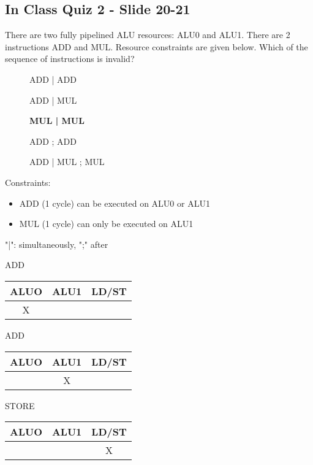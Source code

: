 \documentclass{report}
\newcommand{\cmark}{\ding{51}}%
\newcommand{\xmark}{\ding{55}}%
\begin{document}
\subsection{In Class Quiz 2 - Slide 20-21}
There are two fully pipelined ALU resources: ALU0 and ALU1. There are 2 instructions ADD and MUL. Resource constraints are given below. Which of the sequence of instructions is invalid?
\vspace{-1em}
\begin{multicols}{2}
  \begin{description}
    \item [\cmark] ADD | ADD
    \item [\cmark] ADD | MUL
    \item [\xmark] \textbf{MUL | MUL}
    \item [\cmark] ADD ; ADD
    \item [\cmark] ADD | MUL ; MUL
  \end{description}
  \setlength{\leftskip}{-8em}
  Constraints:
  \begin{itemize}
  \setlength{\leftskip}{-8em}
    \item ADD (1 cycle) can be executed on ALU0 or ALU1
    \item MUL (1 cycle) can only be executed on ALU1
  \end{itemize}
  "|": simultaneously, ";" after
\end{multicols}
\vspace{-2em}
\begin{multicols}{3}
ADD \\
\begin{tabular}{|c|c|c|}
  \hline
  ALUO & ALU1 & LD/ST \\
  \hline
  X    &      &       \\
  \hline
\end{tabular}
  \vfill\columnbreak
ADD \\
\begin{tabular}{|c|c|c|}
  \hline
  ALUO & ALU1 & LD/ST \\
  \hline
       & X    &       \\
  \hline
\end{tabular}
  \vfill\columnbreak
STORE \\
\begin{tabular}{|c|c|c|}
  \hline
  ALUO & ALU1 & LD/ST \\
  \hline
       &      & X     \\
  \hline
\end{tabular}
\end{multicols}
\end{document}
